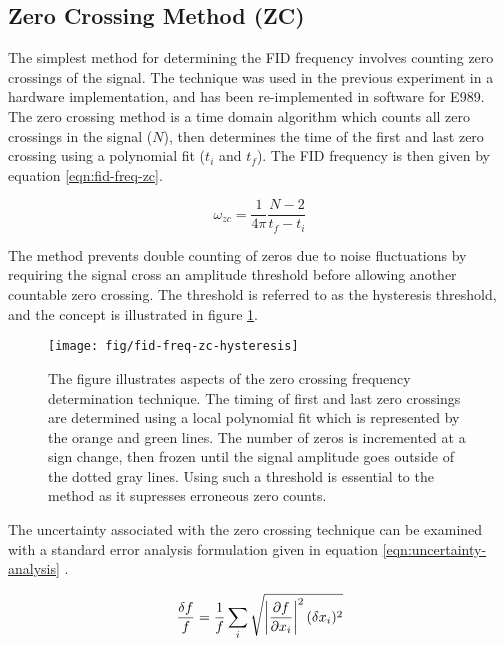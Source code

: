 \subsection{Zero Crossing Method (ZC)}
The simplest method for determining the FID frequency involves counting zero crossings of the signal.  The technique was used in the previous \mugmtwo experiment in a hardware implementation, and has been re-implemented in software for E989.  The zero crossing method is a time domain algorithm which counts all zero crossings in the signal ($N$), then determines the time of the first and last zero crossing using a polynomial fit ($t_i$ and $t_f$).  The FID frequency is then given by equation \ref{eqn:fid-freq-zc}.

\begin{equation}
\label{eqn:fid-freq-zc}
\omega_{zc} = \frac{1}{4 \pi}\frac{N - 2}{t_f - t_i}
\end{equation}

\noindent
The method prevents double counting of zeros due to noise fluctuations by requiring the signal cross an amplitude threshold before allowing another countable zero crossing.  The threshold is referred to as the hysteresis threshold, and the concept is illustrated in figure \ref{fig:fid-freq-zc-hysteresis}.

\begin{figure}
\centering
\texttt{[image: fig/fid-freq-zc-hysteresis]}
\caption{
    The figure illustrates aspects of the zero crossing frequency determination technique.  The timing of first and last zero crossings are determined using a local polynomial fit which is represented by the orange and green lines.  The number of zeros is incremented at a sign change, then frozen until the signal amplitude goes outside of the dotted gray lines.  Using such a threshold is essential to the method as it supresses erroneous zero counts.
    \label{fig:fid-freq-zc-hysteresis}
}
\end{figure}

The uncertainty associated with the zero crossing technique can be examined with a standard error analysis formulation given in equation \ref{eqn:uncertainty-analysis} \cite{error-taylor}.

\begin{equation}
\label{eqn:uncertainty-analysis}
\frac{\delta f}{f} = \frac{1}{f} \sum_{i} \\
\sqrt{\left| \frac{\partial f}{\partial x_i} \right|^2 (\delta x_i)^2}
\end{equation}

